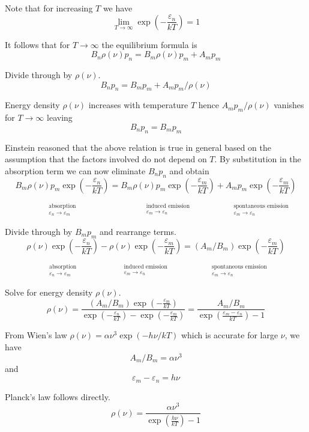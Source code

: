 \documentclass[12pt]{article}
\newcommand\BNM{B_n} %
\newcommand\BMN{B_m} %
\newcommand\AMN{A_m} %
\newcommand\ABSORPTION{\substack{\phantom{0}\\ \text{absorption}\\ \varepsilon_n\rightarrow\varepsilon_m}}
\newcommand\INDUCED{\substack{\phantom{0}\\ \text{induced emission}\\ \varepsilon_m\rightarrow\varepsilon_n}}
\newcommand\SPONTANEOUS{\substack{\phantom{0}\\ \text{spontaneous emission}\\ \varepsilon_m\rightarrow\varepsilon_n}}
\begin{document}
\noindent
Note that for increasing $T$ we have
\begin{equation*}
\lim_{T\rightarrow\infty}\exp\left(-\frac{\varepsilon_n}{kT}\right)=1
\end{equation*}

\noindent
It follows that for $T\rightarrow\infty$ the equilibrium formula is
\begin{equation*}
\BNM\rho(\nu)p_n
=\BMN\rho(\nu)p_m
+\AMN p_m
\end{equation*}

\noindent
Divide through by $\rho(\nu)$.
\begin{equation*}
\BNM p_n=\BMN p_m+\AMN p_m/\rho(\nu)
\end{equation*}

\noindent
Energy density $\rho(\nu)$ increases with temperature $T$
hence $\AMN p_m/\rho(\nu)$ vanishes for $T\rightarrow\infty$ leaving
\begin{equation*}
\BNM p_n=\BMN p_m
\end{equation*}

\noindent
Einstein reasoned that the above relation is true in general based on the assumption that
the factors involved do not depend on $T$.
By substitution in the absorption term we can now eliminate $B_np_n$ and obtain
\begin{equation*}
\underset{\ABSORPTION}{\BMN\rho(\nu)p_m\exp\left(-\frac{\varepsilon_n}{kT}\right)}
=\underset{\INDUCED}{\BMN\rho(\nu)p_m\exp\left(-\frac{\varepsilon_m}{kT}\right)}
+\underset{\SPONTANEOUS}{\AMN p_m\exp\left(-\frac{\varepsilon_m}{kT}\right)}
\end{equation*}

\noindent
Divide through by $\BMN p_m$ and rearrange terms.
\begin{equation*}
\underset{\ABSORPTION}{\rho(\nu)\exp\left(-\frac{\varepsilon_n}{kT}\right)}
-\underset{\INDUCED}{\rho(\nu)\exp\left(-\frac{\varepsilon_m}{kT}\right)}
=\underset{\SPONTANEOUS}{(\AMN/\BMN)\exp\left(-\frac{\varepsilon_m}{kT}\right)}
\end{equation*}

\noindent
Solve for energy density $\rho(\nu)$.
\begin{equation*}
\rho(\nu)=\frac
{\displaystyle(\AMN/\BMN)\exp\left(-\frac{\varepsilon_m}{kT}\right)}
{\displaystyle\exp\left(-\frac{\varepsilon_n}{kT}\right)-\exp\left(-\frac{\varepsilon_m}{kT}\right)}
=\frac{\AMN/\BMN}{\displaystyle\exp\left(\frac{\varepsilon_m-\varepsilon_n}{kT}\right)-1}
\end{equation*}

\noindent
From Wien's law
$\rho(\nu)=\alpha\nu^3\exp(-h\nu/kT)$ which is accurate for large $\nu$, we have
\begin{equation*}
\AMN/\BMN=\alpha\nu^3
\end{equation*}
and
\begin{equation*}
\varepsilon_m-\varepsilon_n=h\nu
\end{equation*}

\noindent
Planck's law follows directly.
\begin{equation*}
\rho(\nu)=\frac{\alpha\nu^3}{\displaystyle\exp\left(\frac{h\nu}{kT}\right)-1}
\end{equation*}
\end{document}

